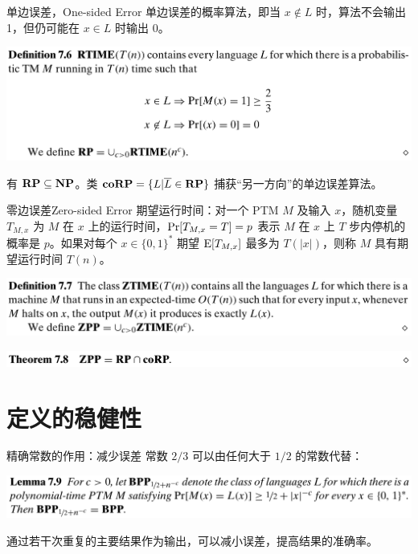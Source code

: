 \documentclass[UTF8,aspectratio=169,mathserif]{beamer}
\begin{document}
	\begin{frame}{单边误差，One-sided Error}
		单边误差的概率算法，即当 $x\notin L$ 时，算法不会输出 1，但仍可能在 $x\in L$ 时输出 0。\newline
		
		\includegraphics[width=\linewidth]{../../7/note.assets/image-20210509133757822.png}\newline
		
		有 $\bf RP\subseteq NP$。类 ${\bf coRP}=\{L|\overline{L}\in{\bf RP}\}$ 捕获“另一方向”的单边误差算法。
	\end{frame}

	\begin{frame}{零边误差}{Zero-sided Error}
		期望运行时间：对一个 PTM $M$ 及输入 $x$，随机变量 $T_{M,x}$ 为 $M$ 在 $x$ 上的运行时间，${\rm Pr}[T_{M,x}=T]=p$ 表示 $M$ 在 $x$ 上 $T$ 步内停机的概率是 $p$。如果对每个 $x\in\{0,1\}^*$ 期望 ${\rm E}[T_{M,x}]$ 最多为 $T(|x|)$，则称 $M$ 具有期望运行时间 $T(n)$。\newline
		
		\includegraphics[width=\linewidth]{../../7/note.assets/image-20210509153030302.png}\newline
		
		\includegraphics[width=\linewidth]{../../7/note.assets/image-20210509153059395.png}
	\end{frame}
	
	\section{定义的稳健性}
	\begin{frame}{精确常数的作用：减少误差}
		常数 $2/3$ 可以由任何大于 $1/2$ 的常数代替：\newline
		
		\includegraphics[width=\linewidth]{../../7/note.assets/image-20210509153425924.png}\newline
		
		通过若干次重复的主要结果作为输出，可以减小误差，提高结果的准确率。
	\end{frame}
\end{document}
